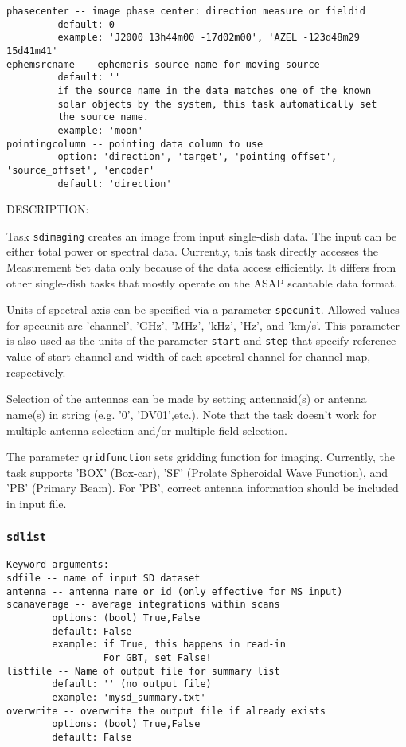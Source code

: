 \begin{verbatim}
phasecenter -- image phase center: direction measure or fieldid 
         default: 0
         example: 'J2000 13h44m00 -17d02m00', 'AZEL -123d48m29 15d41m41'
ephemsrcname -- ephemeris source name for moving source
         default: ''
         if the source name in the data matches one of the known 
         solar objects by the system, this task automatically set 
         the source name. 
         example: 'moon' 
pointingcolumn -- pointing data column to use
         option: 'direction', 'target', 'pointing_offset', 'source_offset', 'encoder' 
         default: 'direction'
\end{verbatim}

        DESCRIPTION:

        Task {\tt sdimaging} creates an image from input single-dish data.
        The input can be either total power or spectral data. Currently,
        this task directly accesses the Measurement Set data only because of 
        the data access efficiently. It differs from other single-dish tasks 
        that mostly operate on the ASAP scantable data format.
 
        Units of spectral axis can be specified via a parameter {\tt specunit}.
        Allowed values for specunit are 'channel', 'GHz', 'MHz', 'kHz', 'Hz', 
        and 'km/s'. This parameter is also used as the units of the parameter 
        {\tt start} and {\tt step} that specify reference value of start channel and width 
        of each spectral channel for channel map, respectively.

        Selection of the antennas can be made by setting antennaid(s) or 
        antenna name(s) in string (e.g. '0', 'DV01',etc.). Note that the task 
        doesn't work for multiple antenna selection and/or multiple field 
        selection. 

        The parameter {\tt gridfunction} sets gridding function for imaging. 
        Currently, the task supports 'BOX' (Box-car), 'SF' (Prolate Spheroidal 
        Wave Function), and 'PB' (Primary Beam). For 'PB', correct antenna 
        information should be included in input file. 


\subsubsection{{\tt sdlist}}
\label{section:sd.sdtasks.tasks.sdlist}

\begin{verbatim}
Keyword arguments:
sdfile -- name of input SD dataset
antenna -- antenna name or id (only effective for MS input)
scanaverage -- average integrations within scans
        options: (bool) True,False
        default: False
        example: if True, this happens in read-in
                 For GBT, set False!
listfile -- Name of output file for summary list
        default: '' (no output file)
        example: 'mysd_summary.txt'
overwrite -- overwrite the output file if already exists
        options: (bool) True,False
        default: False
\end{verbatim}
    
